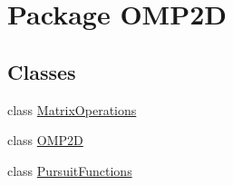 \hypertarget{namespaceOMP2D}{\section{Package O\-M\-P2\-D}
\label{namespaceOMP2D}
}
\subsection*{Classes}
\begin{DoxyCompactItemize}
\item 
class \hyperlink{classOMP2D_1_1MatrixOperations}{Matrix\-Operations}
\item 
class \hyperlink{classOMP2D_1_1OMP2D}{O\-M\-P2\-D}
\item 
class \hyperlink{classOMP2D_1_1PursuitFunctions}{Pursuit\-Functions}
\end{DoxyCompactItemize}
